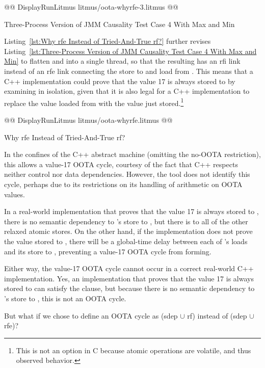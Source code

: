 \documentclass[10]{article}
\begin{document}
\begin{listing}[tbp]
@@ DisplayRunLitmus litmus/oota-whyrfe-3.litmus @@
\caption{Three-Process Version of JMM Causality Test Case 4 With Max and Min}
\label{lst:Three-Process Version of JMM Causality Test Case 4 With Max and Min}
\end{listing}

Listing~\ref{lst:Why rfe Instead of Tried-And-True rf?}
further revises
Listing~\ref{lst:Three-Process Version of JMM Causality Test Case 4 With Max and Min}
to flatten  and  into a single thread, so that the
resulting  has an rfi link instead of an rfe link connecting
the store to and load from .
This means that a C++ implementation could prove that the value 17 is
always stored to  by examining  in isolation, given that
it is also legal for a C++ implementation to replace the value loaded
from  with the value just stored.\footnote{
	This is not an option in C because atomic operations are volatile,
	and thus observed behavior.}

\begin{listing}[tbp]
@@ DisplayRunLitmus litmus/oota-whyrfe.litmus @@
\caption{Why rfe Instead of Tried-And-True rf?}
\label{lst:Why rfe Instead of Tried-And-True rf?}
\end{listing}

In the confines of the C++ abstract machine (omitting the no-OOTA
restriction), this allows a value-17 OOTA cycle, courtesy of the fact
that C++ respects neither control nor data dependencies.
However, the  tool does not identify this cycle, perhaps due
to its restrictions on its handling of arithmetic on OOTA values.

In a real-world implementation that proves that the value 17 is always
stored to , there is no semantic dependency to
's store to , but there is to all of the other relaxed
atomic stores.
On the other hand, if the implementation does not prove the value
stored to , there will be a global-time delay between each of
's loads and its store to , preventing a value-17 OOTA
cycle from forming.

Either way, the value-17 OOTA cycle cannot occur in a correct real-world
C++ implementation.
Yes, an implementation that proves that the value 17 is always
stored to  can satisfy the  clause, but because
there is no semantic dependency to 's store to ,
this is not an OOTA cycle.

But what if we chose to define an OOTA cycle as (sdep $\cup$ rf) instead
of (sdep $\cup$ rfe)?
\end{document}

